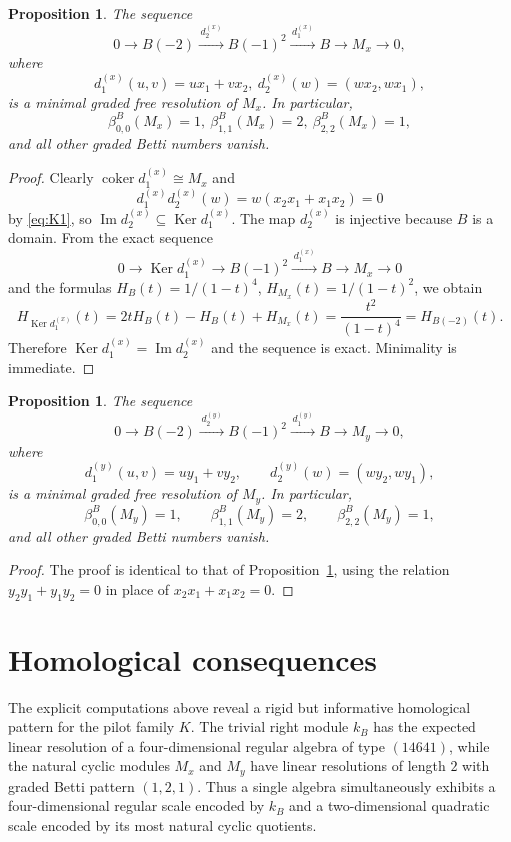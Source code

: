 \documentclass[reqno]{amsart}
\numberwithin{equation}{section}
\newtheorem{proposition}[theorem]{Proposition}
\theoremstyle{definition}
\begin{document}
\begin{proposition}\label{prop:Mx}
The sequence
\[
0\longrightarrow B(-2)\xrightarrow{\,d_2^{(x)}\,}B(-1)^2\xrightarrow{\,d_1^{(x)}\,}B\longrightarrow M_x\longrightarrow 0,
\]
where
\[
d_1^{(x)}(u,v)=ux_1+vx_2,
\
d_2^{(x)}(w)=(wx_2,wx_1),
\]
is a minimal graded free resolution of \(M_x\). In particular,
\[
\beta_{0,0}^B(M_x)=1,\
\beta_{1,1}^B(M_x)=2,\
\beta_{2,2}^B(M_x)=1,
\]
and all other graded Betti numbers vanish.
\end{proposition}

\begin{proof}
Clearly \(\operatorname{coker} d_1^{(x)}\cong M_x\) and
\[
d_1^{(x)}d_2^{(x)}(w)=w(x_2x_1+x_1x_2)=0
\]
by \eqref{eq:K1}, so \(\operatorname{Im}d_2^{(x)}\subseteq \operatorname{Ker} d_1^{(x)}\). The map \(d_2^{(x)}\) is injective because \(B\) is a domain. From the exact sequence
\[
0\longrightarrow \operatorname{Ker} d_1^{(x)}\longrightarrow B(-1)^2\xrightarrow{\,d_1^{(x)}\,}B\longrightarrow M_x\longrightarrow 0
\]
and the formulas \(H_B(t)=1/(1-t)^4\), \(H_{M_x}(t)=1/(1-t)^2\), we obtain
\[
H_{\operatorname{Ker} d_1^{(x)}}(t)
=
2tH_B(t)-H_B(t)+H_{M_x}(t)
=
\frac{t^2}{(1-t)^4}
=
H_{B(-2)}(t).
\]
Therefore \(\operatorname{Ker} d_1^{(x)}=\operatorname{Im}d_2^{(x)}\) and the sequence is exact. Minimality is immediate.
\end{proof}

\begin{proposition}\label{prop:My}
The sequence
\[
0\longrightarrow B(-2)\xrightarrow{\,d_2^{(y)}\,}B(-1)^2\xrightarrow{\,d_1^{(y)}\,}B\longrightarrow M_y\longrightarrow 0,
\]
where
\[
d_1^{(y)}(u,v)=uy_1+vy_2,
\qquad
d_2^{(y)}(w)=(wy_2,wy_1),
\]
is a minimal graded free resolution of \(M_y\). In particular,
\[
\beta_{0,0}^B(M_y)=1,\qquad
\beta_{1,1}^B(M_y)=2,\qquad
\beta_{2,2}^B(M_y)=1,
\]
and all other graded Betti numbers vanish.
\end{proposition}

\begin{proof}
The proof is identical to that of Proposition~\ref{prop:Mx}, using the relation \(y_2y_1+y_1y_2=0\) in place of \(x_2x_1+x_1x_2=0\).
\end{proof}

\section{Homological consequences}

The explicit computations above reveal a rigid but informative homological pattern for the pilot family \(K\). The trivial right module \(k_B\) has the expected linear resolution of a four-dimensional regular algebra of type \((14641)\), while the natural cyclic modules \(M_x\) and \(M_y\) have linear resolutions of length \(2\) with graded Betti pattern \((1,2,1)\). Thus a single algebra simultaneously exhibits a four-dimensional regular scale encoded by \(k_B\) and a two-dimensional quadratic scale encoded by its most natural cyclic quotients.
\end{document}
